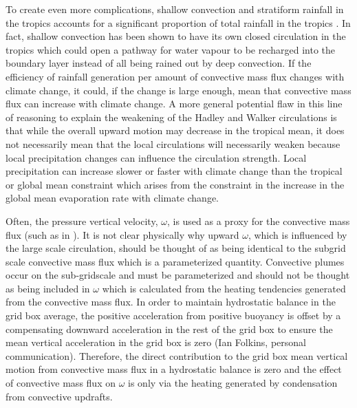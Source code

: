 \documentclass[letterpaper,12pt,titlepage,oneside,final]{book}
\begin{document}
To create even more complications, shallow convection and stratiform rainfall in the tropics accounts for a significant proportion of total rainfall in the tropics \citep{schumacher_stratiform_2003}. In fact, shallow convection has been shown to have its own closed circulation in the tropics \citep{folkins_ian_low-level_2008} which could open a pathway for water vapour to be recharged into the boundary layer instead of all being rained out by deep convection. If the efficiency of rainfall generation per amount of convective mass flux changes with climate change, it could, if the change is large enough, mean that convective mass flux can increase with climate change. A more general potential flaw in this line of reasoning to explain the weakening of the Hadley and Walker circulations is that while the overall upward motion may decrease in the tropical mean, it does not necessarily mean that the local circulations will necessarily weaken \citep{merlis_changes_2011} because local precipitation changes can influence the circulation strength. Local precipitation can increase slower or faster with climate change than the tropical or global mean constraint which arises from the constraint in the increase in the global mean evaporation rate with climate change. 

Often, the pressure vertical velocity, $\omega$, is used as a proxy for the convective mass flux (such as in \cite{vecchi_global_2007,schneider_water_2010}). It is not clear physically why upward $\omega$, which is influenced by the large scale circulation, should be thought of as being identical to the subgrid scale convective mass flux which is a parameterized quantity. Convective plumes occur on the sub-gridscale and must be parameterized and should not be thought as being included in $\omega$ which is calculated from the heating tendencies generated from the convective mass flux. In order to maintain hydrostatic balance in the grid box average, the positive acceleration from positive buoyancy is offset by a compensating downward acceleration in the rest of the grid box to ensure the mean vertical acceleration in the grid box is zero (Ian Folkins, personal communication). Therefore, the direct contribution to the grid box mean vertical motion from convective mass flux in a hydrostatic balance is zero and the effect of convective mass flux on $\omega$ is only via the heating generated by condensation from convective updrafts.
\end{document}
